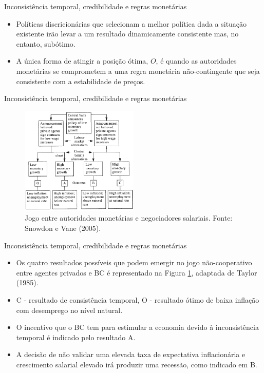 \documentclass[10pt]{beamer}
\begin{document}
\begin{frame}{Inconsistência temporal, credibilidade e regras monetárias}
    \begin{itemize}
        \item Políticas discricionárias que selecionam a melhor política dada a situação existente irão levar a um resultado dinamicamente consistente mas, no entanto, subótimo.
        \bigskip
        \item A única forma de atingir a posição ótima, $O$, é quando as autoridades monetárias se comprometem a uma regra monetária não-contingente que seja consistente com a estabilidade de preços. 
    \end{itemize}
\end{frame}

\begin{frame}{Inconsistência temporal, credibilidade e regras monetárias}
    \begin{figure}
        \centering
        \includegraphics[width=0.5\textwidth]{./figures/aula12_fig3.PNG}
        \caption{Jogo entre autoridades monetárias e negociadores salariais. Fonte: Snowdon e Vane (2005).}
        \label{fig3}
    \end{figure}
\end{frame}

\begin{frame}{Inconsistência temporal, credibilidade e regras monetárias}
    \begin{itemize}
        \item Os quatro resultados possíveis que podem emergir no jogo não-cooperativo entre agentes privados e BC é representado na Figura \ref{fig3}, adaptada de Taylor (1985).
        \bigskip
        \item C - resultado de consistência temporal, O - resultado ótimo de baixa inflação com desemprego no nível natural.
        \bigskip
        \item O incentivo que o BC tem para estimular a economia devido à inconsistência temporal é indicado pelo resultado A.
        \bigskip
        \item A decisão de não validar uma elevada taxa de expectativa inflacionária e crescimento salarial elevado irá produzir uma recessão, como indicado em B.
    \end{itemize}
\end{frame}
\end{document}

